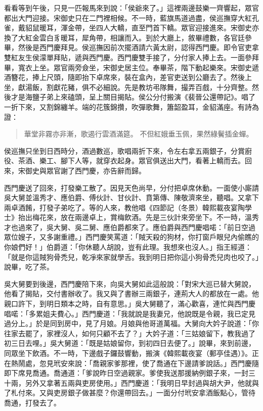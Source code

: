 看看等到午後，只見一匹報馬來到說：「侯爺來了。」這裡兩邊鼓樂一齊響起，眾官都出大門迎接。宋御史只在二門裡相候。不一時，藍旗馬道過盡，侯巡撫穿大紅孔雀，戴貂鼠暖耳，渾金帶，坐四人大轎，直至門首下轎。眾官迎接進來。宋御史亦換了大紅金雲白豸暖耳，犀角帶，相讓而入。到於大廳上，敘畢禮數，各官廷參畢，然後是西門慶拜見。侯巡撫因前次擺酒請六黃太尉，認得西門慶。即令官吏拿雙紅友生侯濛單拜貼，遞與西門慶。西門慶雙手接了，分付家人捧上去。一面參拜畢，寬衣上坐。眾官兩旁僉坐，宋御史居主位。奉畢茶，階下動起樂來。宋御史遞酒簪花，捧上尺頭，隨即抬下卓席來，裝在盒內，差官吏送到公廳去了。然後上坐，獻湯飯，割獻花豬，俱不必細說。先是教坊弔隊舞，撮弄百戲，十分齊整。然後才是海鹽子弟上來磕頭，呈上關目揭貼。侯公分付搬演《裴晉公還帶記》。唱了一折下來，又割錦纏羊。端的花簇錦攢，吹彈歌舞，簫韶盈耳，金貂滿座。有詩為證：
\begin{quote}
華堂非霧亦非漸，歌遏行雲酒滿筵。
不但紅娥垂玉佩，果然綠鬢插金蟬。
\end{quote}

侯巡撫只坐到日西時分，酒過數巡，歌唱兩折下來，令左右拿五兩銀子，分賞廚役、茶酒、樂工、腳下人等，就穿衣起身。眾官俱送出大門，看著上轎而去。回來，宋御史與眾官謝了西門慶，亦告辭而歸。

西門慶送了回來，打發樂工散了。因見天色尚早，分付把卓席休動。一面使小廝請吳大舅並溫秀才、應伯爵、傅伙計、甘伙計、賁第傳、陳敬濟來坐，聽唱。又拿下兩卓酒餚，打發子弟吃了。等的人來，教他唱《四節記（冬景）韓熙載夜宴陶學士》抬出梅花來，放在兩邊卓上，賞梅飲酒。先是三伙計來旁坐下。不一時，溫秀才也過來了，吳大舅、吳二舅、應伯爵都來了。應伯爵與西門慶唱喏：「前日空過眾位嫂子，又多謝重禮。」西門慶笑罵道：「賊天殺的狗材，你打窗戶眼兒內偷瞧的你娘們好！」伯爵道：「你休聽人胡說，豈有此理。我想來也沒人。」指王經道：「就是你這賊狗骨禿兒，乾凈來家就學舌。我到明日把你這小狗骨禿兒肉也咬了。」說畢，吃了茶。

吳大舅要到後邊，西門慶陪下來，向吳大舅如此這般說：「對宋大巡已替大舅說，他看了揭貼，交付書辦收了。我又與了書辦三兩銀子，連荊大人的都放在一處。他親口許下，到明日類本之時，自有意思。」吳大舅聽了，滿心歡喜，連忙與西門慶唱喏：「多累姐夫費心。」西門慶道：「我就說是我妻兄，他說既是令親，我已定見過分上。」於是同到房中，見了月娘。月娘與他哥道萬福。大舅向大妗子說道：「你往家去罷了，家裡沒人，如何只顧不去了？」大妗子道：「三姑娘留下，教我過了初三日去哩。」吳大舅道：「既是姑娘留你，到初四日去便了。」說畢，來到前邊，同眾坐下飲酒。不一時，下邊戲子鑼鼓響動，搬演《韓熙載夜宴（郵亭佳遇）》。正在熱鬧處，忽見玳安來說：「喬親家爹那裡，使了喬通在下邊請爹說話。」西門慶隨即下席見喬通。喬通道：「爹說昨日空過親家。爹使我送那援納例銀子來，一封三十兩，另外又拿著五兩與吏房使用。」西門慶道：「我明日早封過與胡大尹，他就與了札付來。又與吏房銀子做甚麼？你還帶回去。」一面分付玳安拿酒飯點心，管待喬通，打發去了。

